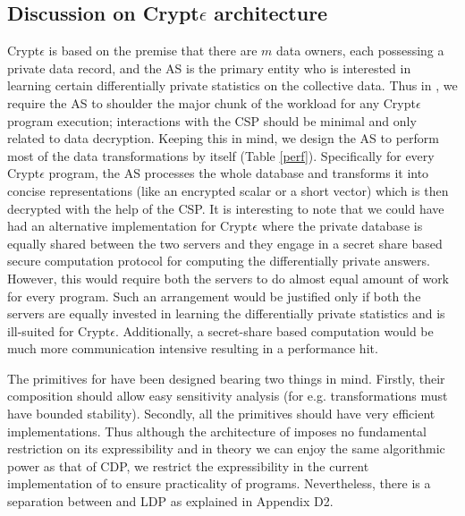 \subsection{Discussion on Crypt$\epsilon$ architecture}\label{architecture}
 Crypt$\epsilon$  is based on the premise that there are $m$  data owners, each possessing a private data record, and the \textsf{AS} is the primary entity who is interested in learning certain differentially private statistics on the collective data.  Thus in \system, we require the \textsf{AS} to  shoulder the major chunk of the workload for any Crypt$\epsilon$ program execution; interactions with the \textsf{CSP} should be minimal and only related to data decryption.
Keeping this in  mind, we design the \textsf{AS} to perform most of the data transformations by itself (Table \ref{perf}). Specifically for every Crypt$\epsilon$ program, the \textsf{AS} processes the whole database and transforms it into concise representations (like an encrypted scalar or a short vector) which is then decrypted with the help of the \textsf{CSP}. It is interesting to note that we could have had an alternative implementation for Crypt$\epsilon$ where the private database is equally shared between the two servers and they engage in a secret share based secure computation protocol for computing the differentially private answers. However, this would require both the servers to do almost equal amount of work for every program. Such an arrangement would be justified only if both the servers are equally invested in learning the differentially private statistics and is ill-suited for Crypt$\epsilon$. Additionally, a secret-share based computation would be much more communication intensive resulting in a performance hit. 

The primitives for \system have been designed bearing two things in mind. Firstly, their composition should allow easy sensitivity analysis (for e.g. transformations must have bounded stability). Secondly, all the primitives should have very efficient implementations. Thus although the architecture of \system imposes no fundamental restriction on its expressibility and in theory we can enjoy the same algorithmic power as that of \textsf{CDP}, we restrict the expressibility in the current implementation of \system to ensure practicality of \system programs. Nevertheless, there is a separation between \system and \textsf{LDP} as explained in Appendix D2.


